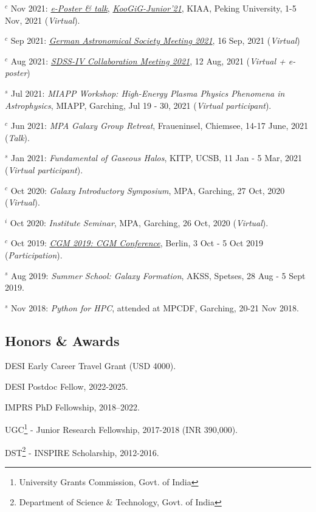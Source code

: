 \documentclass[12pt,letterpaper]{article}
\begin{document}
\begin{list}{}{\cvlist}
\item $^c$ Nov 2021:  \emph{\href{https://www.bilibili.com/video/BV1nv411M7w3}{e-Poster \& talk}}, \emph{\href{https://kiaa.pku.edu.cn/KooGig_junior21/Home.htm}{KooGiG-Junior'21}}, KIAA, Peking University, 1-5 Nov, 2021 (\textit{Virtual}).   

\item $^c$ Sep 2021:  \emph{\href{https://ag2021.astronomische-gesellschaft.de/view_splinter.php?session=Stars}{German Astronomical Society Meeting 2021}}, 16 Sep, 2021 (\textit{Virtual})   
\item $^c$ Aug 2021:  \emph{\href{https://jhu2021.sdss.org/}{SDSS-IV Collaboration Meeting 2021}}, 12 Aug, 2021 (\textit{Virtual + e-poster})   
\item $^s$ Jul 2021:  \emph{MIAPP Workshop: High-Energy Plasma Physics Phenomena in Astrophysics}, MIAPP, Garching, Jul 19 - 30, 2021 (\textit{Virtual participant}).  

\item $^c$ Jun 2021:  \emph{MPA Galaxy Group Retreat}, Fraueninsel, Chiemsee, 14-17 June, 2021 (\textit{Talk}).  
\item $^s$ Jan 2021:  \emph{Fundamental of Gaseous Halos}, KITP, UCSB, 11 Jan - 5 Mar, 2021 (\textit{Virtual participant}).  
\item $^c$ Oct 2020:  \emph{Galaxy Introductory Symposium}, MPA, Garching, 27 Oct, 2020 (\textit{Virtual}).  
\item $^i$ Oct 2020:  \emph{Institute Seminar}, MPA, Garching, 26 Oct, 2020 (\textit{Virtual}).  

\item $^c$ Oct 2019:  \emph{\href{https://wwwmpa.mpa-garching.mpg.de/conf/berlincgm2019/}{CGM 2019: CGM Conference}}, Berlin, 3 Oct - 5 Oct 2019 (\textit{Participation}).  
\item $^s$ Aug 2019:  \emph{Summer School: Galaxy Formation}, AKSS, Spetses, 28 Aug - 5 Sept 2019.  
\item $^s$ Nov 2018:  \emph{Python for HPC}, attended at MPCDF, Garching, 20-21 Nov 2018.  

\end{list}

\subsection{Honors \& Awards}
\begin{list}{}{\cvlist}
  \item DESI Early Career Travel Grant (USD 4000).
  \item DESI Postdoc Fellow, 2022-2025.
  \item IMPRS PhD Fellowship, 2018--2022.
  \item UGC\footnote{University Grants Commission, Govt. of India} - Junior Research Fellowship, 2017-2018 (INR 390,000).
  \item DST\footnote{Department of Science \& Technology, Govt. of India} - INSPIRE Scholarship, 2012-2016.

\end{list}
\end{document}

